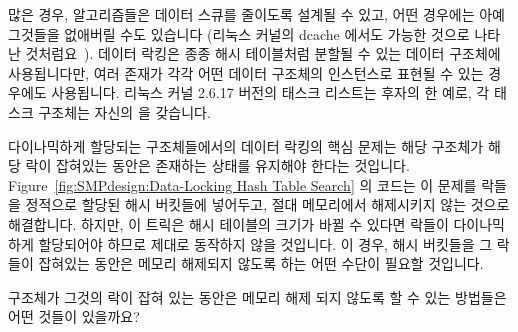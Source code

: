 많은 경우, 알고리즘들은 데이터 스큐를 줄이도록 설계될 수 있고, 어떤 경우에는
아예 그것들을 없애버릴 수도 있습니다 (리눅스 커널의 dcache 에서도 가능한 것으로
나타난 것처럼요~\cite{McKenney04a}).
데이터 락킹은 종종 해시 테이블처럼 분할될 수 있는 데이터 구조체에 사용됩니다만,
여러 존재가 각각 어떤 데이터 구조체의 인스턴스로 표현될 수 있는 경우에도
사용됩니다.
리눅스 커널 2.6.17 버전의 태스크 리스트는 후자의 한 예로, 각 태스크 구조체는
자신의  을 갖습니다.

다이나믹하게 할당되는 구조체들에서의 데이터 락킹의 핵심 문제는 해당 구조체가
해당 락이 잡혀있는 동안은 존재하는 상태를 유지해야 한다는 것입니다.
Figure~\ref{fig:SMPdesign:Data-Locking Hash Table Search} 의 코드는 이 문제를
락들을 정적으로 할당된 해시 버킷들에 넣어두고, 절대 메모리에서 해제시키지 않는
것으로 해결합니다.
하지만, 이 트릭은 해시 테이블의 크기가 바뀔 수 있다면 락들이 다이나믹하게
할당되어야 하므로 제대로 동작하지 않을 것입니다.
이 경우, 해시 버킷들을 그 락들이 잡혀있는 동안은 메모리 해제되지 않도록 하는
어떤 수단이 필요할 것입니다.

\QuickQuiz{}
	구조체가 그것의 락이 잡혀 있는 동안은 메모리 해제 되지 않도록 할 수
	있는 방법들은 어떤 것들이 있을까요?
	\iffalse

